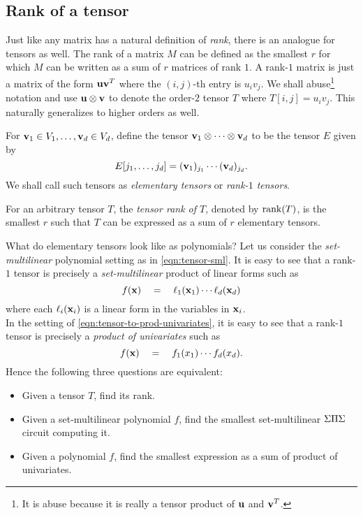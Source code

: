 \subsection{Rank of a tensor}

Just like any matrix has a natural definition of \emph{rank}, there is an analogue for tensors as well.
The rank of a matrix $M$ can be defined as the smallest $r$ for which $M$ can be written as a sum of $r$ matrices of rank $1$.
A rank-$1$ matrix is just a matrix of the form $\mathbf{u} \mathbf{v}^T$ where the $(i,j)$-th entry is $u_iv_j$.
We shall abuse\footnote{It is abuse because it is really a tensor product of $\mathbf{u}$ and $\mathbf{v}^T$.}
notation and use $\mathbf{u} \otimes \mathbf{v}$ to denote the order-$2$ tensor $T$ where $T[i,j] = u_i v_j$.
This naturally generalizes to higher orders as well.

\begin{definition}
  For $\mathbf{v}_1\in V_1, \ldots, \mathbf{v}_d \in V_d$, define the tensor $\mathbf{v}_1 \otimes \cdots \otimes \mathbf{v}_d$ to be the tensor $E$ given by
\[
E[j_1,\ldots, j_d] = (\mathbf{v}_1)_{j_1} \cdots (\mathbf{v}_d)_{j_d}.
\]
We shall call such tensors as \emph{elementary tensors} or \emph{rank-$1$ tensors}. 

For an arbitrary tensor $T$, the \emph{tensor rank of $T$}, denoted by $\operatorname{rank}(T)$, is the smallest $r$ such that $T$ can be expressed as a sum of $r$ elementary tensors. 
\end{definition}

\noindent 
What do elementary tensors look like as polynomials?
Let us consider the \emph{set-multilinear} polynomial setting as in \eqref{eqn:tensor-sml}.
It is easy to see that a rank-$1$ tensor is precisely a \emph{set-multilinear} product of linear forms such as
\[
f(\mathbf{x}) \quad = \quad \ell_1(\mathbf{x}_1) \cdots \ell_d(\mathbf{x}_d)
\]
where each $\ell_i(\mathbf{x}_i)$ is a linear form in the variables in $\mathbf{x}_i$. \\

In the setting of \eqref{eqn:tensor-to-prod-univariates}, it is easy to see that a rank-$1$ tensor is precisely a \emph{product of univariates} such as
\[
f(\mathbf{x}) \quad = \quad f_1(x_1)\cdots f_d(x_d).
\]
\noindent
Hence the following three questions are equivalent:
\begin{itemize}
\setlength\itemsep{0em}
\item Given a tensor $T$, find its rank. 
\item Given a set-multilinear polynomial $f$, find the smallest set-multilinear $\Sigma\Pi\Sigma$ circuit computing it. 
\item Given a polynomial $f$, find the smallest expression as a sum of product of univariates.
\end{itemize}

